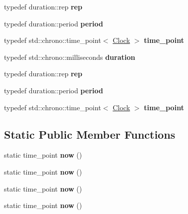 \begin{DoxyCompactItemize}
\item 
\mbox{\label{struct_clock_aacf3506bbc1d04f6f89c663c83020d78}} 
typedef duration\+::rep {\bfseries rep}
\item 
\mbox{\label{struct_clock_a051e087c3a00ba40aa6dffc24d93f041}} 
typedef duration\+::period {\bfseries period}
\item 
\mbox{\label{struct_clock_a11d12a0f1b544dc4b571e9f62df03680}} 
typedef std\+::chrono\+::time\+\_\+point$<$ \mbox{\hyperlink{struct_clock}{Clock}} $>$ {\bfseries time\+\_\+point}
\item 
\mbox{\label{struct_clock_a795730dd7c32330c2e247269ce99ebfd}} 
typedef std\+::chrono\+::milliseconds {\bfseries duration}
\item 
\mbox{\label{struct_clock_aacf3506bbc1d04f6f89c663c83020d78}} 
typedef duration\+::rep {\bfseries rep}
\item 
\mbox{\label{struct_clock_a051e087c3a00ba40aa6dffc24d93f041}} 
typedef duration\+::period {\bfseries period}
\item 
\mbox{\label{struct_clock_a11d12a0f1b544dc4b571e9f62df03680}} 
typedef std\+::chrono\+::time\+\_\+point$<$ \mbox{\hyperlink{struct_clock}{Clock}} $>$ {\bfseries time\+\_\+point}
\end{DoxyCompactItemize}
\subsection*{Static Public Member Functions}
\begin{DoxyCompactItemize}
\item 
\mbox{\label{struct_clock_a91d03aa4e6e7d4d5d5dc92c6fb19e261}} 
static time\+\_\+point {\bfseries now} ()
\item 
\mbox{\label{struct_clock_a91d03aa4e6e7d4d5d5dc92c6fb19e261}} 
static time\+\_\+point {\bfseries now} ()
\item 
\mbox{\label{struct_clock_a91d03aa4e6e7d4d5d5dc92c6fb19e261}} 
static time\+\_\+point {\bfseries now} ()
\item 
\mbox{\label{struct_clock_a91d03aa4e6e7d4d5d5dc92c6fb19e261}} 
static time\+\_\+point {\bfseries now} ()
\end{DoxyCompactItemize}
